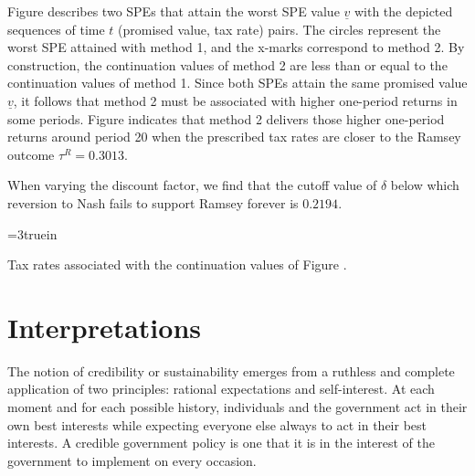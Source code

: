 Figure  describes two SPEs that attain the worst
SPE value  $\underline v$
with the depicted sequences of time $t$ (promised value, tax rate) pairs.
The circles represent the worst SPE attained with
method 1, and the x-marks correspond to method 2. By construction, the
continuation values of method 2 are less than or equal to the continuation
values of method 1. Since both SPEs attain the same promised value
$\underline v$, it follows that method 2 must be associated with higher
one-period returns in some periods. %
Figure  indicates that method 2
delivers those higher one-period returns around period 20 when the
prescribed tax rates are closer to the Ramsey outcome $\tau^R=0.3013$.



When varying the discount factor, we find that the cutoff
value of $\delta$ below which reversion to Nash fails
to support Ramsey forever is $0.2194$.


\centerline{\epsfxsize=3truein}
\caption{Tax rates associated with the continuation values of Figure .}
\endfigure

\vfill\supereject

\section{Interpretations}\label{sec:spe_interpretations}%
  The notion of credibility or sustainability emerges from a ruthless
and complete application of two principles: rational expectations and
self-interest.  At each moment and for each possible history, individuals and
the government act in their own best interests while expecting everyone else
always to act in their best interests.  A credible government policy is one
that it is in the interest of the government to implement on every occasion.

